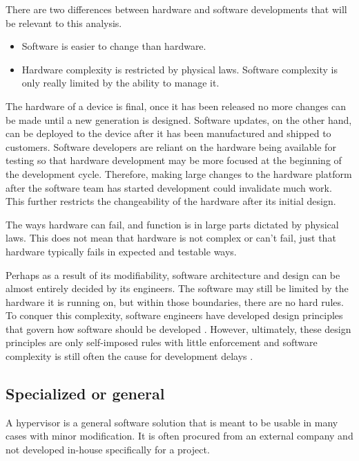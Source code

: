 There are two differences between hardware and software developments that will be relevant to this analysis. 
\begin{itemize}
\item Software is easier to change than hardware. 
\item Hardware complexity is restricted by physical laws. Software complexity is only really limited by the ability to manage it.
\end{itemize}
The hardware of a device is final, once it has been released no more changes can be made until a new generation is designed. Software updates, on the other hand, can be deployed to the device after it has been manufactured and shipped to customers. Software developers are reliant on the hardware being available for testing so that hardware development may be more focused at the beginning of the development cycle. Therefore, making large changes to the hardware platform after the software team has started development could invalidate much work. This further restricts the changeability of the hardware after its initial design.

The ways hardware can fail, and function is in large parts dictated by physical laws. This does not mean that hardware is not complex or can't fail, just that hardware typically fails in expected and testable ways.

Perhaps as a result of its modifiability, software architecture and design can be almost entirely decided by its engineers. The software may still be limited by the hardware it is running on, but within those boundaries, there are no hard rules. To conquer this complexity, software engineers have developed design principles that govern how software should be developed \cite{martin2009clean}.
However, ultimately, these design principles are only self-imposed rules with little enforcement and software complexity is still often the cause for development delays \cite{hegde2011insight}. 

\subsection{Specialized or general}
A hypervisor is a general software solution that is meant to be usable in many cases with minor modification. It is often procured from an external company and not developed in-house specifically for a project.

